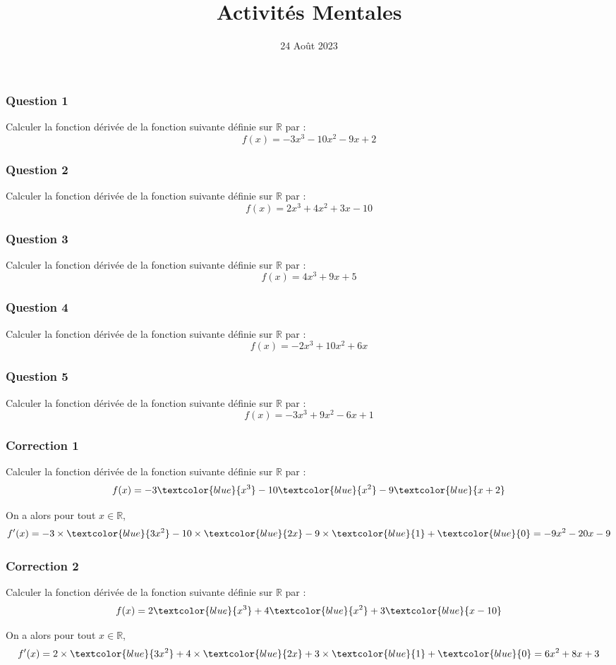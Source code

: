 \documentclass[15pt, mathserif]{beamer}
\title{Activités Mentales}
\date{24 Août 2023}
\newcommand{\R}{\mathbb{R}}			%
\begin{document}
\begin{frame}
    \titlepage
\end{frame}

\begin{frame} 
	\frametitle{Question 1}
Calculer la fonction dérivée de la fonction suivante définie sur $\R$ par : $$f(x)=-3x^3-10x^2-9x+2$$\end{frame}


\begin{frame} 
	\frametitle{Question 2}
Calculer la fonction dérivée de la fonction suivante définie sur $\R$ par : $$f(x)=2x^3+4x^2+3x-10$$\end{frame}


\begin{frame} 
	\frametitle{Question 3}
Calculer la fonction dérivée de la fonction suivante définie sur $\R$ par : $$f(x)=4x^3+9x+5$$\end{frame}


\begin{frame} 
	\frametitle{Question 4}
Calculer la fonction dérivée de la fonction suivante définie sur $\R$ par : $$f(x)=-2x^3+10x^2+6x$$\end{frame}


\begin{frame} 
	\frametitle{Question 5}
Calculer la fonction dérivée de la fonction suivante définie sur $\R$ par : $$f(x)=-3x^3+9x^2-6x+1$$\end{frame}


\begin{frame}
\vspace{-10mm}
	\frametitle{Correction 1}
Calculer la fonction dérivée de la fonction suivante définie sur $\R$ par : $$f(x)=-3\textcolor{blue}{x^3}-10\textcolor{blue}{x^2}-9\textcolor{blue}{x+2}$$
 
 On a alors pour tout $x \in  \R$, $$f'(x)= -3\times \textcolor{blue}{3x^2} -10\times \textcolor{blue}{2x}-9\times \textcolor{blue}{1}+\textcolor{blue}{0}=-9x^2-20x-9$$\end{frame}


\begin{frame}
\vspace{-10mm}
	\frametitle{Correction 2}
Calculer la fonction dérivée de la fonction suivante définie sur $\R$ par : $$f(x)=2\textcolor{blue}{x^3}+4\textcolor{blue}{x^2}+3\textcolor{blue}{x-10}$$
 
 On a alors pour tout $x \in  \R$, $$f'(x)= 2\times \textcolor{blue}{3x^2} +4\times \textcolor{blue}{2x}+3\times \textcolor{blue}{1}+\textcolor{blue}{0}=6x^2+8x+3$$\end{frame}
\end{document}
